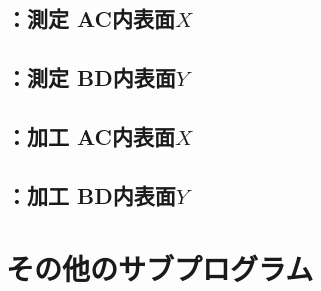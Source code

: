 \clearpage
\subsection{\DMLthreeAC：測定 AC内表面\texorpdfstring{$X$}{X}}



\clearpage
\subsection{\DMLthreeBD：測定 BD内表面\texorpdfstring{$Y$}{Y}}



\clearpage
\subsection{\DKLthreeAC：加工 AC内表面\texorpdfstring{$X$}{X}}



\clearpage
\subsection{\DKLthreeBD：加工 BD内表面\texorpdfstring{$Y$}{Y}}




\clearpage
\section{その他のサブプログラム}


